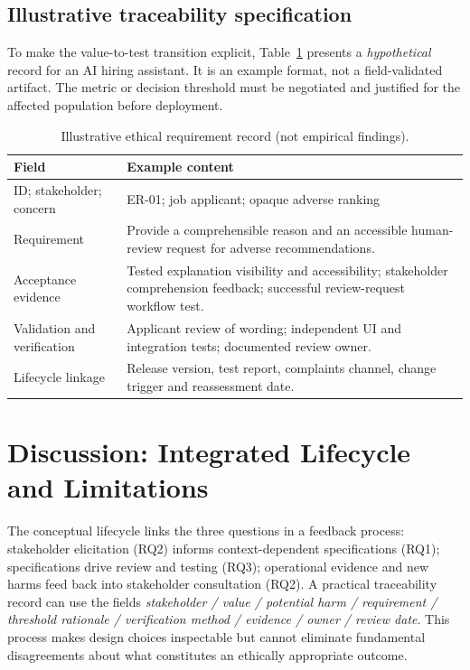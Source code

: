 \documentclass[11pt,a4paper]{article}
\begin{document}
\subsection{Illustrative traceability specification}
To make the value-to-test transition explicit, Table~\ref{tab:record} presents a \emph{hypothetical} record for an AI hiring assistant. It is an example format, not a field-validated artifact. The metric or decision threshold must be negotiated and justified for the affected population before deployment.

\begin{table}[htbp]
\centering\footnotesize
\caption{Illustrative ethical requirement record (not empirical findings).}
\label{tab:record}
\begin{tabularx}{\linewidth}{p{3.25cm}X}
\toprule
\textbf{Field} & \textbf{Example content}\\
\midrule
ID; stakeholder; concern & ER-01; job applicant; opaque adverse ranking\\
Requirement & Provide a comprehensible reason and an accessible human-review request for adverse recommendations.\\
Acceptance evidence & Tested explanation visibility and accessibility; stakeholder comprehension feedback; successful review-request workflow test.\\
Validation and verification & Applicant review of wording; independent UI and integration tests; documented review owner.\\
Lifecycle linkage & Release version, test report, complaints channel, change trigger and reassessment date.\\
\bottomrule
\end{tabularx}
\end{table}

\section{Discussion: Integrated Lifecycle and Limitations}
The conceptual lifecycle links the three questions in a feedback process: stakeholder elicitation (RQ2) informs context-dependent specifications (RQ1); specifications drive review and testing (RQ3); operational evidence and new harms feed back into stakeholder consultation (RQ2). A practical traceability record can use the fields \emph{stakeholder / value / potential harm / requirement / threshold rationale / verification method / evidence / owner / review date}. This process makes design choices inspectable but cannot eliminate fundamental disagreements about what constitutes an ethically appropriate outcome.
\end{document}

